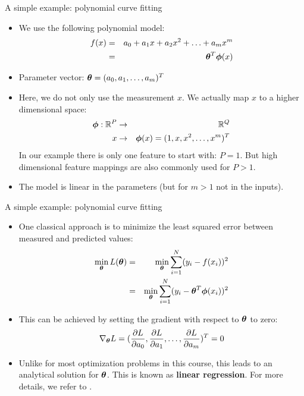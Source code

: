 \documentclass[xcolor=pdftex,dvipsnames,table]{beamer}
\begin{document}
\begin{frame}{A simple example: polynomial curve fitting}
\begin{itemize}
	\item We use the following polynomial model:
	\begin{eqnarray}
	f(x) &=& a_0 + a_1 x + a_2 x^2 + \ldots + a_m x^m \nonumber \\
	&=& \boldsymbol{\theta}^T \boldsymbol{\phi} (x)
	\end{eqnarray}
	\item Parameter vector: $\boldsymbol{\theta} = (a_0, a_1, \ldots, a_m)^T$
	\item Here, we do not only use the measurement $x$. We actually map $x$ to a higher dimensional space:
	\begin{eqnarray}
		\boldsymbol{\phi} : \mathbb{R}^{P} &\rightarrow & \mathbb{R}^Q \nonumber \\
		x &\rightarrow & \boldsymbol{\phi} (x) = (1, x, x^2, \ldots, x^m)^T
	\end{eqnarray}
	In our example there is only one feature to start with: $P=1$. But high dimensional feature mappings are also commonly used for $P>1$. 
	\item The model is linear in the parameters (but for $m>1$ not in the inputs). 
\end{itemize}
\end{frame}

\begin{frame}{A simple example: polynomial curve fitting}
\begin{itemize}
	\item One classical approach is to minimize the least squared error between measured and predicted values:
	\begin{eqnarray}
		\min_{\boldsymbol{\theta}} L(\boldsymbol{\theta}) &=& \min_{\boldsymbol{\theta}} \sum_{i=1}^N (y_i - f(x_i))^2 \nonumber \\
		&=& \min_{\boldsymbol{\theta}} \sum_{i=1}^N (y_i - \boldsymbol{\theta}^T \boldsymbol{\phi} (x_i))^2 
	\end{eqnarray}
	\item This can be achieved by setting the gradient with respect to $\boldsymbol{\theta}$ to zero:
	\begin{equation}
		\nabla_{\boldsymbol{\theta}} L = (\frac{\partial L}{\partial a_0}, \frac{\partial L}{\partial a_1}, \ldots, \frac{\partial L}{\partial a_m} )^T = 0
	\end{equation}
	\item Unlike for most optimization problems in this course, this leads to an analytical solution for $\boldsymbol{\theta}$. This is known as \textbf{linear regression}. For more details, we refer to \cite{Hastie2009}.
\end{itemize}
\end{frame}
\end{document}
